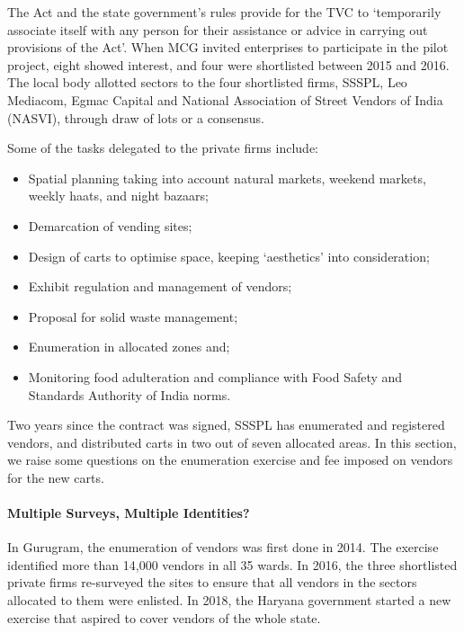 \documentclass[a4paper, 12pt, twoside]{article}
\begin{document}
{{The Act and the state government’s rules provide for the TVC to `temporarily associate itself with any person for their assistance or advice in carrying out provisions of the Act'. When MCG invited enterprises to participate in the pilot project, eight showed interest, and four were shortlisted between 2015 and 2016. The local body allotted sectors to the four shortlisted firms, SSSPL, Leo Mediacom, Egmac Capital and National Association of Street Vendors of India (NASVI), through draw of lots or a consensus.

Some of the tasks delegated to the private firms include:
\begin{itemize}
\item Spatial planning taking into account natural markets, weekend markets, weekly haats, and night bazaars;
\item Demarcation of vending sites;
\item Design of carts to optimise space, keeping `aesthetics' into consideration;
\item Exhibit regulation and management of vendors;
\item Proposal for solid waste management;
\item Enumeration in allocated zones and;
\item Monitoring food adulteration and compliance with Food Safety and Standards Authority of India norms.
\end{itemize}

Two years since the contract was signed, SSSPL has enumerated and registered vendors, and distributed carts in two out of seven allocated areas. In this section, we raise some questions on the enumeration exercise and fee imposed on vendors for the new carts.

\paragraph*{Multiple Surveys, Multiple Identities?} 

In Gurugram, the enumeration of vendors was first done in 2014. The exercise identified more than 14,000 vendors in all 35 wards. In 2016, the three shortlisted private firms re-surveyed the sites to ensure that all vendors in the sectors allocated to them were enlisted. In 2018, the Haryana government started a new exercise that aspired to cover vendors of the whole state. \\

}}
\end{document}
